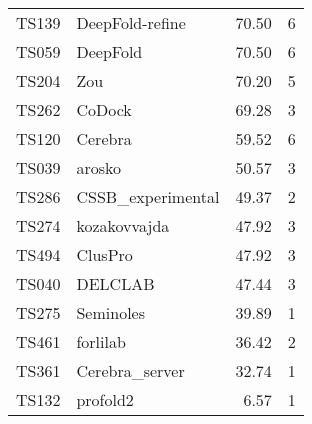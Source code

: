\begin{table}[ht]
{\begin{tabular}{llrr}
TS139 & DeepFold-refine & 70.50 & 6 \\ 
TS059 & DeepFold & 70.50 & 6 \\ 
TS204 & Zou & 70.20 & 5 \\ 
TS262 & CoDock & 69.28 & 3 \\ 
TS120 & Cerebra & 59.52 & 6 \\ 
TS039 & arosko & 50.57 & 3 \\ 
TS286 & CSSB\_experimental & 49.37 & 2 \\ 
TS274 & kozakovvajda & 47.92 & 3 \\ 
TS494 & ClusPro & 47.92 & 3 \\ 
TS040 & DELCLAB & 47.44 & 3 \\ 
TS275 & Seminoles & 39.89 & 1 \\ 
TS461 & forlilab & 36.42 & 2 \\ 
TS361 & Cerebra\_server & 32.74 & 1 \\ 
TS132 & profold2 & 6.57 & 1 \\ 
\bottomrule
\end{tabular}%
}
\end{table}
